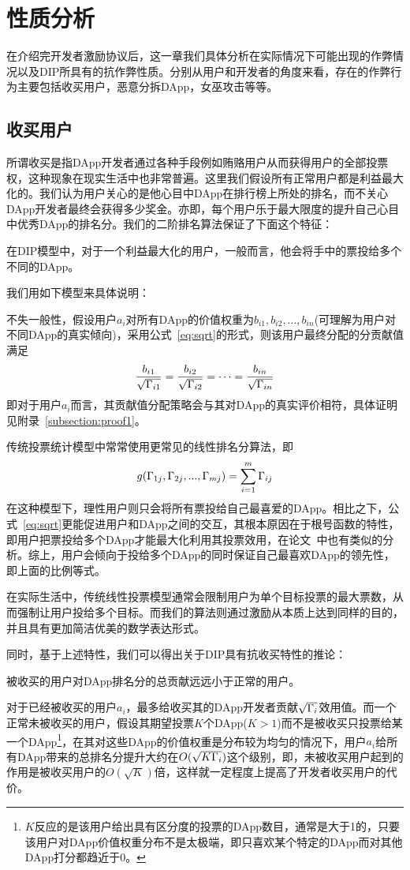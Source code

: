 \section{性质分析}
\label{section:properties}
在介绍完开发者激励协议后，这一章我们具体分析在实际情况下可能出现的作弊情况以及DIP所具有的抗作弊性质。分别从用户和开发者的角度来看，存在的作弊行为主要包括收买用户，恶意分拆DApp，女巫攻击等等。%

\subsection{收买用户}
所谓收买是指DApp开发者通过各种手段例如贿赂用户从而获得用户的全部投票权，这种现象在现实生活中也非常普遍。这里我们假设所有正常用户都是利益最大化的。我们认为用户关心的是他心目中DApp在排行榜上所处的排名，而不关心DApp开发者最终会获得多少奖金。亦即，每个用户乐于最大限度的提升自己心目中优秀DApp的排名分。我们的二阶排名算法保证了下面这个特征：

\begin{property}
	\label{p1}
	在DIP模型中，对于一个利益最大化的用户，一般而言，他会将手中的票投给多个不同的DApp。
\end{property}
我们用如下模型来具体说明：

不失一般性，假设用户$a_i$对所有DApp的价值权重为$b_{i1},b_{i2},...,b_{in}$(可理解为用户对不同DApp的真实倾向)，采用公式~\ref{eq:sqrt}的形式，则该用户最终分配的分贡献值满足
$$\frac{b_{i1}}{\sqrt{\Gamma_{i1}}}=\frac{b_{i2}}{\sqrt{\Gamma_{i2}}}=\cdots=\frac{b_{in}}{\sqrt{\Gamma_{in}}}$$
即对于用户$a_i$而言，其贡献值分配策略会与其对DApp的真实评价相符，具体证明见附录~\ref{subsection:proof1}。

传统投票统计模型中常常使用更常见的线性排名分算法，即
$$g(\Gamma_{1j},\Gamma_{2j},...,\Gamma_{mj}) = \sum_{i=1}^m \Gamma_{ij}$$
在这种模型下，理性用户则只会将所有票投给自己最喜爱的DApp。相比之下，公式~\ref{eq:sqrt}更能促进用户和DApp之间的交互，其根本原因在于根号函数的特性，即用户把票投给多个DApp才能最大化利用其投票效用，在论文~\cite{buterin2018liberal}中也有类似的分析。综上，用户会倾向于投给多个DApp的同时保证自己最喜欢DApp的领先性，即上面的比例等式。

在实际生活中，传统线性投票模型通常会限制用户为单个目标投票的最大票数，从而强制让用户投给多个目标。而我们的算法则通过激励从本质上达到同样的目的，并且具有更加简洁优美的数学表达形式。

同时，基于上述特性，我们可以得出关于DIP具有抗收买特性的推论：
\begin{corollary}
被收买的用户对DApp排名分的总贡献远远小于正常的用户。
\end{corollary}
对于已经被收买的用户$a_i$，最多给收买其的DApp开发者贡献$\sqrt{\Gamma_i}$效用值。而一个正常未被收买的用户，假设其期望投票$K$个DApp($K>1$)而不是被收买只投票给某一个DApp\footnote{$K$反应的是该用户给出具有区分度的投票的DApp数目，通常是大于1的，只要该用户对DApp价值权重分布不是太极端，即只喜欢某个特定的DApp而对其他DApp打分都趋近于0。}，在其对这些DApp的价值权重是分布较为均匀的情况下，用户$a_i$给所有DApp带来的总排名分提升大约在$O(\sqrt{K\Gamma_i})$这个级别，即，未被收买用户起到的作用是被收买用户的$O(\sqrt{K})$倍，这样就一定程度上提高了开发者收买用户的代价。

